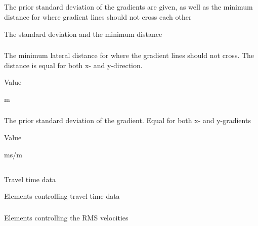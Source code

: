 \subsection{}
 \slist
   \item \Description The prior standard deviation of the gradients are given, as well as the minimum distance for where gradient lines should not cross each other
   \item \Argument The standard deviation and the minimum distance
   \item \Default
 \elist

\subsubsection{}
 \slist
   \item \Description The minimum lateral distance for where the gradient lines should not cross. The distance is equal for both x- and y-direction.
   \item \Argument Value
   \item {} m
 \elist

\subsubsection{}
 \slist
   \item \Description The prior standard deviation of the gradient. Equal for both x- and y-gradients
   \item \Argument Value
   \item {} ms/m
 \elist

\subsection{}
 \slist
   \item \Description Travel time data
   \item \Argument Elements controlling travel time data
   \item \Default
 \elist

\subsubsection{}
 \slist
   \item \Description Elements controlling the RMS velocities
   \item \Argument
   \item \Default
 \elist

